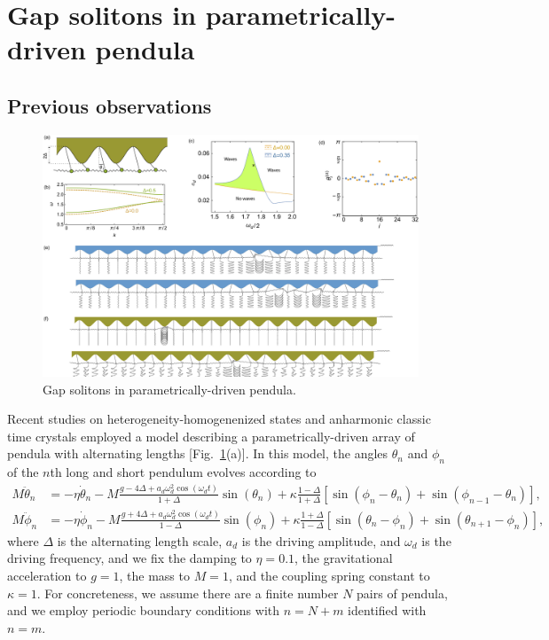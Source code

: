 \documentclass[aps,pre,amsmath,amssymb,floatfix,onecolumn,notitlepage,10pt]{revtex4-1}
\begin{document}
\section{Gap solitons in parametrically-driven pendula}
\subsection{Previous observations}
\begin{figure}[hbt]
\includegraphics[width=\columnwidth]{pendula}
\caption{Gap solitons in parametrically-driven pendula. \label{fig1}}
\end{figure}
Recent studies on heterogeneity-homogenenized states \cite{2021_Nicolaou_1} and anharmonic classic time crystals \cite{2021_Nicolaou_2} employed a model describing a parametrically-driven array of pendula with alternating lengths [Fig.~\ref{fig1}(a)]. In this model, the angles $\theta_n$ and $\phi_n$ of the $n$th long and short pendulum evolves according to
\begin{align}
M \ddot{\theta}_n &= -\eta \dot{\theta}_n-M \frac{g - 4\Delta +  a_d \omega_d^2 \cos(\omega_d t)}{1+\Delta}\sin(\theta_n) +\kappa \frac{1-\Delta}{1+\Delta} \left[\sin(\phi_n-\theta_n) + \sin(\phi_{n-1}-\theta_n)\right],  \label{pendula1} \\
M \ddot{\phi}_n &= -\eta \dot{\phi}_n-M \frac{g + 4\Delta +  a_d \omega_d^2 \cos(\omega_d t)}{1-\Delta}\sin(\phi_n) +\kappa \frac{1+\Delta}{1-\Delta} \left[\sin(\theta_n-\phi_n) + \sin(\theta_{n+1}-\phi_n)\right], \label{pendula2}
\end{align}
where $\Delta$ is the alternating length scale, $a_d$ is the driving amplitude, and $\omega_d$ is the driving frequency, and we fix the damping to $\eta=0.1$, the gravitational acceleration to $g=1$, the mass to $M=1$, and the coupling spring constant to $\kappa=1$. For concreteness, we assume there are a finite number $N$ pairs of pendula, and we employ periodic boundary conditions with $n=N+m$ identified with $n=m$.
\end{document}
